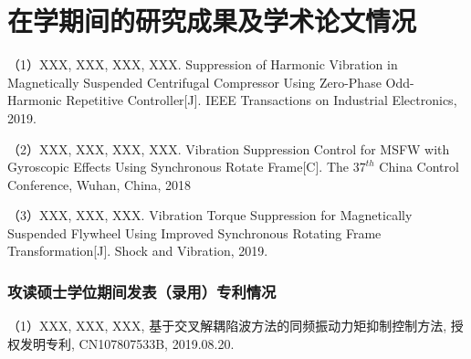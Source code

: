 \chapter{在学期间的研究成果及学术论文情况}
（1）XXX, XXX, XXX, XXX. Suppression of Harmonic Vibration in Magnetically Suspended Centrifugal Compressor Using Zero-Phase Odd-Harmonic Repetitive Controller[J]. IEEE Transactions on Industrial Electronics, 2019.

（2）XXX, XXX, XXX, XXX. Vibration Suppression Control for MSFW with Gyroscopic Effects Using Synchronous Rotate Frame[C]. The $37^{th}$ China Control Conference, Wuhan, China, 2018
 
（3）XXX, XXX, XXX. Vibration Torque Suppression for Magnetically Suspended Flywheel Using Improved Synchronous Rotating Frame Transformation[J]. Shock and Vibration, 2019.

\subsection*{攻读硕士学位期间发表（录用）专利情况}

（1）XXX, XXX, XXX, 基于交叉解耦陷波方法的同频振动力矩抑制控制方法, 授权发明专利, CN107807533B, 2019.08.20.


